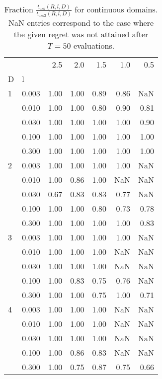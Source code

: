 \begin{table}
\centering
\caption{Fraction $\frac{t_{ucb}(R,l,D)}{t_{ucb2}(R,l,D)}$ for 
    continuous domains. NaN entries correspond to the case where the 
    given regret was not attained after $T=50$ evaluations.}
\label{fig:continuous_ucb_vs_ucb2}
\begin{tabular}{llrrrrr}
\toprule
  &       &   2.5 &   2.0 &   1.5 &   1.0 &   0.5 \\
D & l &       &       &       &       &       \\
\midrule
1 & 0.003 &  1.00 &  1.00 &  0.89 &  0.86 &   NaN \\
  & 0.010 &  1.00 &  1.00 &  0.80 &  0.90 &  0.81 \\
  & 0.030 &  1.00 &  1.00 &  1.00 &  1.00 &  0.90 \\
  & 0.100 &  1.00 &  1.00 &  1.00 &  1.00 &  1.00 \\
  & 0.300 &  1.00 &  1.00 &  1.00 &  1.00 &  1.00 \\
2 & 0.003 &  1.00 &  1.00 &  1.00 &  1.00 &   NaN \\
  & 0.010 &  1.00 &  0.86 &  1.00 &   NaN &   NaN \\
  & 0.030 &  0.67 &  0.83 &  0.83 &  0.77 &   NaN \\
  & 0.100 &  1.00 &  1.00 &  0.80 &  0.73 &  0.78 \\
  & 0.300 &  1.00 &  1.00 &  1.00 &  1.00 &  0.83 \\
3 & 0.003 &  1.00 &  1.00 &  1.00 &  1.00 &   NaN \\
  & 0.010 &  1.00 &  1.00 &  1.00 &   NaN &   NaN \\
  & 0.030 &  1.00 &  1.00 &  1.00 &   NaN &   NaN \\
  & 0.100 &  1.00 &  0.83 &  0.75 &  0.76 &   NaN \\
  & 0.300 &  1.00 &  1.00 &  0.75 &  1.00 &  0.71 \\
4 & 0.003 &  1.00 &  1.00 &  1.00 &   NaN &   NaN \\
  & 0.010 &  1.00 &  1.00 &  1.00 &   NaN &   NaN \\
  & 0.030 &  1.00 &  1.00 &  1.00 &   NaN &   NaN \\
  & 0.100 &  1.00 &  0.86 &  0.83 &   NaN &   NaN \\
  & 0.300 &  1.00 &  0.75 &  0.87 &  0.75 &  0.66 \\
\bottomrule
\end{tabular}
\end{table}

